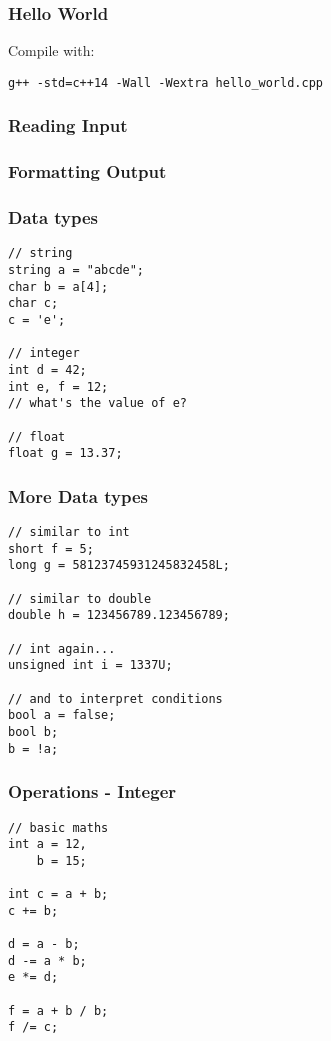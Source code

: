 \begin{frame}[fragile]
    \frametitle{Hello World}
    
    Compile with:
    \begin{lstlisting}[numbers=none]
g++ -std=c++14 -Wall -Wextra hello_world.cpp
    \end{lstlisting} %
\end{frame}

\begin{frame}[fragile]
    \frametitle{Reading Input}
    
\end{frame}

\begin{frame}[fragile]
    \frametitle{Formatting Output}
    
\end{frame}

\begin{frame}[fragile]
    \frametitle{Data types}
\begin{lstlisting}
// string
string a = "abcde";
char b = a[4];
char c;
c = 'e';

// integer
int d = 42;
int e, f = 12;
// what's the value of e?

// float
float g = 13.37;
\end{lstlisting}
\end{frame}

\begin{frame}[fragile]
    \frametitle{More Data types}
\begin{lstlisting}
// similar to int
short f = 5;
long g = 58123745931245832458L;

// similar to double
double h = 123456789.123456789;

// int again...
unsigned int i = 1337U;

// and to interpret conditions
bool a = false;
bool b;
b = !a;
\end{lstlisting}
\end{frame}

\begin{frame}[fragile]
    \frametitle{Operations - Integer}
\begin{lstlisting}
// basic maths
int a = 12,
    b = 15;

int c = a + b;
c += b;

d = a - b;
d -= a * b;
e *= d;

f = a + b / b;
f /= c;
\end{lstlisting}
\end{frame}

